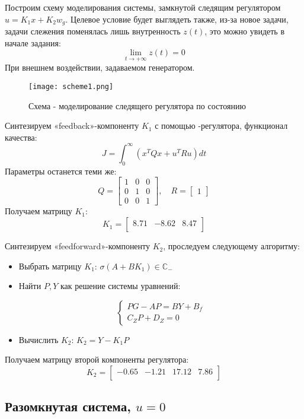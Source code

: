 Построим схему моделирования системы, замкнутой следящим регулятором $u =K_1x+K_2w_g$. Целевое условие будет выглядеть также, из-за новое задачи, задачи слежения поменялась лишь внутренность $z(t)$, это можно увидеть в начале задания:
$$
  \lim_{t\to +\infty} z(t) = 0
$$
При внешнем воздействии, задаваемом генератором. 
\begin{figure}[ht]
  \centering
  \texttt{[image: scheme1.png]}
  \caption{Схема - моделирование следящего регулятора по состоянию}
\end{figure}


Синтезируем «feedback»-компоненту $K_1$ с помощью -регулятора, функционал качества:
$$
  J = \int_0^{\infty} (x^TQx + u^TRu) dt
$$ 
Параметры останется теми же:
$$
  Q = \begin{bmatrix}
    1 & 0 & 0 \\
    0 & 1 & 0 \\
    0 & 0 & 1
  \end{bmatrix}, \quad R = \begin{bmatrix}
    1
  \end{bmatrix}
$$
Получаем матрицу $K_1$:
$$
  K_1 = \begin{bmatrix}
    8.71 & -8.62 & 8.47 \\
\end{bmatrix}
$$

Синтезируем «feedforward»-компоненту $K_2$, проследуем следующему алгоритму:
\begin{itemize}
  \item Выбрать матрицу $K_1$: $\sigma(A+BK_1)\in\mathbb{C}_{-}$
  \item Найти $P, Y$ как решение системы уравнений:
  
  $$
  \begin{cases}
    PG - AP = BY + B_f \\
    C_Z P + D_Z = 0
  \end{cases}
  $$

  \item Вычислить $K_2$: $K_2 = Y - K_1 P$
\end{itemize}
Получаем матрицу второй компоненты регулятора:
$$
  K_2 = \begin{bmatrix}
    -0.65 & -1.21 & 17.12 & 7.86 \\
\end{bmatrix}
$$

\newpage
\subsection{Разомкнутая система, $u=0$}

